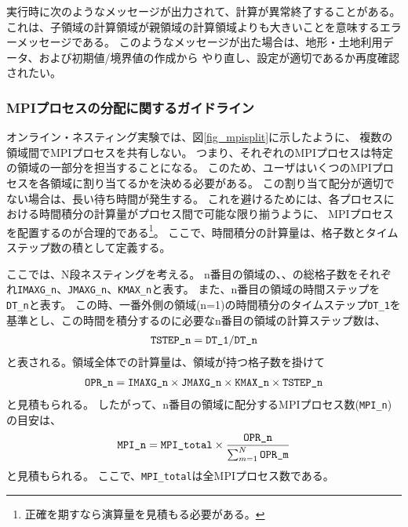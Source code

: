 実行時に次のようなメッセージが出力されて、計算が異常終了することがある。
これは、子領域の計算領域が親領域の計算領域よりも大きいことを意味するエラーメッセージである。
このようなメッセージが出た場合は、地形・土地利用データ、および初期値/境界値の作成から
やり直し、設定が適切であるか再度確認されたい。

\subsubsection{MPIプロセスの分配に関するガイドライン}
オンライン・ネスティング実験では、図\ref{fig_mpisplit}に示したように、
複数の領域間でMPIプロセスを共有しない。
つまり、それぞれのMPIプロセスは特定の領域の一部分を担当することになる。
このため、ユーザはいくつのMPIプロセスを各領域に割り当てるかを決める必要がある。
この割り当て配分が適切でない場合は、長い待ち時間が発生する。
これを避けるためには、各プロセスにおける時間積分の計算量がプロセス間で可能な限り揃うように、
MPIプロセスを配置するのが合理的である\footnote{正確を期すなら演算量を見積もる必要がある。}。
ここで、時間積分の計算量は、格子数とタイムステップ数の積として定義する。


ここでは、N段ネスティングを考える。
n番目の領域の{\XDIR}、{\YDIR}、{\ZDIR}の総格子数をそれぞれ\verb|IMAXG_n|、\verb|JMAXG_n|、\verb|KMAX_n|と表す。
また、n番目の領域の時間ステップを\verb|DT_n|と表す。
この時、一番外側の領域(n=1)の時間積分のタイムステップ\verb|DT_1|を基準とし、この時間を積分するのに必要なn番目の領域の計算ステップ数は、
\begin{eqnarray}
 \verb|TSTEP_n| = \verb|DT_1| / \verb|DT_n|  \nonumber
\end{eqnarray}
と表される。領域全体での計算量は、領域が持つ格子数を掛けて
\begin{eqnarray}
 \verb|OPR_n| = \verb|IMAXG_n| \times \verb|JMAXG_n| \times \verb|KMAX_n| \times \verb|TSTEP_n| \nonumber
\end{eqnarray}
と見積もられる。
したがって、n番目の領域に配分するMPIプロセス数(\verb|MPI_n|)の目安は、
\begin{eqnarray}
 \verb|MPI_n| = \verb|MPI_total| \times \frac{ \texttt{OPR\_n} }{ \sum_{m=1}^N \texttt{OPR\_m} }
\end{eqnarray}
と見積もられる。
ここで、\verb|MPI_total|は全MPIプロセス数である。


